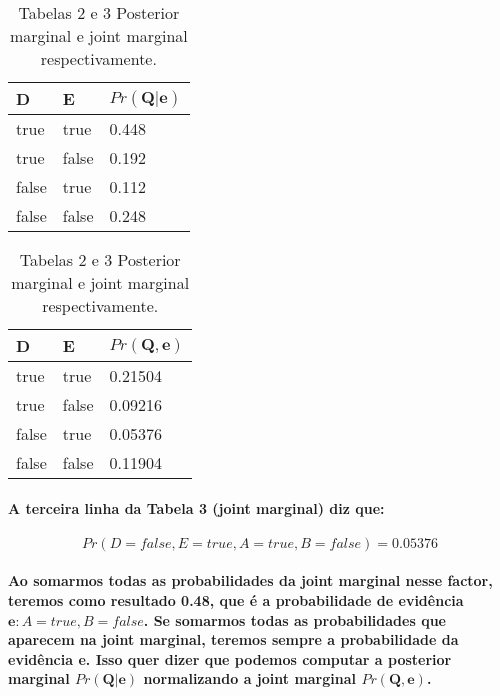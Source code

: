 \documentclass[a4paper,10pt]{article}
\theoremstyle{plain}
\begin{document}
\begin{table}[h]
  \begin{center}
    \captionsetup{justification=centering}
    \begin{tabular}{*{2}{l} | l}
      D & E & $Pr(\textbf{Q} | \textbf{e})$ \\
      \hline
      true & true & 0.448 \\
      true & false & 0.192 \\
      false & true & 0.112 \\
      false & false & 0.248 \\
    \end{tabular}
    \quad
    \quad
    \begin{tabular}{*{2}{l} | l}
      D & E & $Pr(\textbf{Q}, \textbf{e})$ \\
      \hline
      true & true & 0.21504 \\
      true & false & 0.09216 \\
      false & true & 0.05376 \\
      false & false & 0.11904 \\
    \end{tabular}
    \caption*{Tabelas 2 e 3 Posterior marginal e joint marginal respectivamente.}
  \end{center}
\end{table}
\setcounter{table}{3}

\paragraph{
  A terceira linha da Tabela 3 (joint marginal) diz que:
}

\begin{equation}
  Pr(D = false, E = true, A = true, B = false) = 0.05376
\end{equation}

\paragraph{
  Ao somarmos todas as probabilidades da joint marginal nesse factor, teremos como resultado 0.48,
  que é a probabilidade de evidência $\textbf{e}: A = true, B = false$. Se somarmos todas as
  probabilidades que aparecem na joint marginal, teremos sempre a probabilidade da evidência
  \textbf{e}. Isso quer dizer que podemos computar a posterior marginal $Pr(\textbf{Q}|\textbf{e})$
  normalizando a joint marginal $Pr(\textbf{Q}, \textbf{e})$.
}
\end{document}
